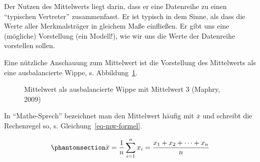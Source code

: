\documentclass[
  letterpaper,
]{scrbook}
\theoremstyle{definition}
\theoremstyle{definition}
\theoremstyle{definition}
\theoremstyle{remark}
\begin{document}
\begin{tcolorbox}[enhanced jigsaw, colbacktitle=quarto-callout-important-color!10!white, coltitle=black, bottomrule=.15mm, rightrule=.15mm, arc=.35mm, toptitle=1mm, colframe=quarto-callout-important-color-frame, opacitybacktitle=0.6, left=2mm, leftrule=.75mm, breakable, opacityback=0, bottomtitle=1mm, titlerule=0mm, title=\textcolor{quarto-callout-important-color}{\faExclamation}\hspace{0.5em}{Wichtig}, colback=white, toprule=.15mm]

Der Nutzen des Mittelwerts liegt darin, dass er eine Datenreihe zu einen
``typischen Vertreter'' zusammenfasst. Er ist typisch in dem Sinne, als
dass die Werte aller Merkmalsträger in gleichem Maße einfließen. Er gibt
uns eine (mögliche) Vorstellung (ein Modell!), wie wir uns die Werte der
Datenreihe vorstellen sollen.

\end{tcolorbox}

Eine nützliche Anschauung zum Mittelwert ist die Vorstellung des
Mittelwerts als eine ausbalancierte Wippe, s. Abbildung~\ref{fig-wippe}.

\begin{figure}


\caption{\label{fig-wippe}Mittelwert als ausbalancierte Wippe mit
Mittelwert 3 (Maphry, 2009)}

\end{figure}%

In ``Mathe-Sprech'' bezeichnet man den Mittelwert häufig mit \(\bar{x}\)
und schreibt die Rechenregel so, s. Gleichung~\ref{eq-mw-formel}.

\begin{equation}\phantomsection\label{eq-mw-formel}{\bar {x} =\frac{1}{n} \sum_{i=1}^{n}{x_{i}}=\frac {x_{1}+x_{2}+\dotsb +x_{n}} {n}}\end{equation}
\end{document}
